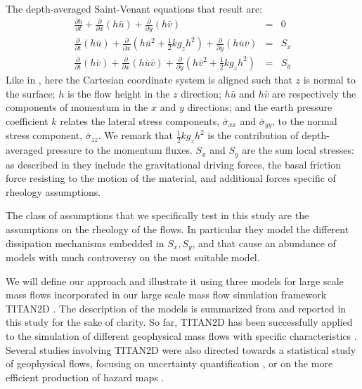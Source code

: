 \documentclass{article}
\begin{document}
The depth-averaged Saint-Venant equations that result are:
\begin{eqnarray}
\label{eq:D_A}
\frac{\partial h}{\partial t} +
\frac{\partial}{\partial x}(h \bar{u}) +
\frac{\partial}{\partial y}(h\bar{v}) &=& 0 \nonumber \\
\frac{\partial}{\partial t} (h\bar{u}) +
\frac{\partial}{\partial x}\left(h\bar{u}^2 + \frac{1}{2}k g_{z}h^2\right) + \frac{\partial}{\partial y}(h\bar{u}\bar{v}) &=& S_{x}\\
\frac{\partial}{\partial t} (h\bar{v}) +
\frac{\partial}{\partial x}(h\bar{u}\bar{v}) +
\frac{\partial}{\partial y}\left(h\bar{v}^2 + \frac{1}{2}k g_{z}h^2\right) &=& S_{y} \nonumber
\end{eqnarray}
Like in \cite{Patra2005}, here the Cartesian coordinate system is aligned such that $z$ is normal to the surface; $h$ is the flow height in the $z$ direction; $h\bar{u}$ and $h\bar{v}$ are respectively the components of momentum in the $x$ and $y$ directions; and the earth pressure coefficient $k$ relates the lateral stress components, $\bar{\sigma}_{xx}$ and $\bar{\sigma}_{yy}$, to the normal stress component, $\bar{\sigma}_{zz}$. %
We remark that $\frac{1}{2} k g_z h^2$ is the contribution of depth-averaged pressure to the momentum fluxes. $S_x$ and $S_y$ are the sum local stresses: as described in \cite{Patra2018b} they include the gravitational driving forces, the basal friction force resisting to the motion of the material, and additional forces specific of rheology assumptions.

The class of assumptions that we specifically test in this study are the assumptions on the rheology of the flows. In particular they model the different dissipation mechanisms embedded in $S_x, S_y$, and that cause an abundance of models with much controversy on the most suitable model. %

We will define our approach and illustrate it using three models for large scale mass flows incorporated in our large scale mass flow simulation framework  TITAN2D \citep{Patra2005,Patra2006, Yu2009, Aghakhani2016}. The description of the models is summarized from \cite{Bevilacqua2019} and reported in this study for the sake of clarity.
So far, TITAN2D has been successfully applied to the simulation of different geophysical mass flows with specific characteristics \citep{Sheridan2005, Rupp2006, Norini2008, Charbonnier2009, Procter2010, Sheridan2010, Sulpizio2010, Capra2011}. Several studies involving TITAN2D were also directed towards a statistical study of geophysical flows, focusing on uncertainty quantification \citep{Dalbey2008, Dalbey2009, Stefanescu2012b, Stefanescu2012a}, or on the more efficient production of hazard maps \citep{Bayarri2009, Spiller2014, Bayarri2015, Ogburn2016, Tierz2018, Bevilacqua2019, Hyman2019, Rutarindwa2019}.
\end{document}
